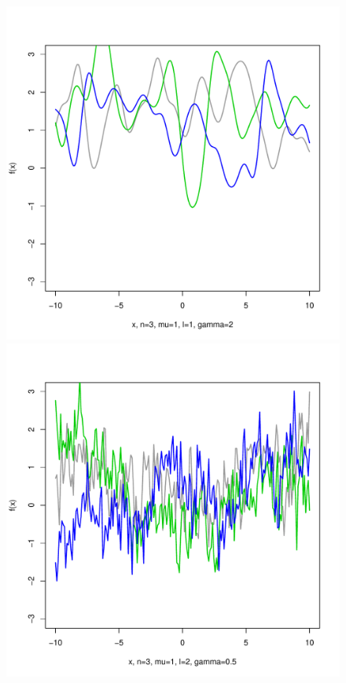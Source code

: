 \documentclass[12pt,letterpaper]{article}
\begin{document}
\begin{figure}
\begin{center}
\includegraphics[scale=0.2]{hw321/n3-m1-l1-g4.pdf}
\includegraphics[scale=0.2]{hw321/n3-m1-l2-g1.pdf}

\end{center}
\end{figure}
\end{document}

